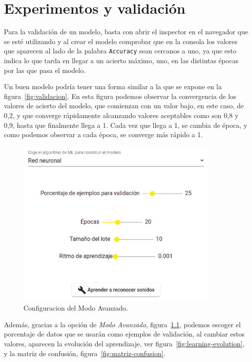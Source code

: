 \documentclass[a4paper, 12pt]{book}
\begin{document}

\cleardoublepage
\chapter{Experimentos y validación}
\label{chap:experimentos-validacion}

Para la validación de un modelo, basta con abrir el inspector en el navegador que se esté utilizando y al crear el modelo comprobar que en la consola los valores que aparecen al lado de la palabra \texttt{Accuracy} sean cercanos a uno, ya que esto indica lo que tarda en llegar a un acierto máximo, uno, en las distintas épocas por las que pasa el modelo.

Un buen modelo podría tener una forma similar a la que se expone en la figura~\ref{fig:validacion}. En esta figura podemos observar la convergencia de los valores de acierto del modelo, que comienzan con un valor bajo, en este caso, de 0,2, y que converge rápidamente alcanzando valores aceptables como son 0,8 y 0,9, hasta que finalmente llega a 1. Cada vez que llega a 1, se cambia de época, y como podemos observar a cada época, se converge más rápido a 1.

\begin{figure}
	\centering
	\includegraphics[width=10cm, keepaspectratio]{img/configuracion-25.png}
	\caption{Configuracion del Modo Avanzado.}\label{fig:configuracion}
\end{figure}

Además, gracias a la opción de \textit{Modo Avanzado}, figura~\ref{fig:configuracion}, podemos escoger el porcentaje de datos que se usarán como ejemplos de validación, al cambiar estos valores, aparecen la evolución del aprendizaje, ver figura~\ref{fig:learning-evolution}, y la matriz de confusión, figura~\ref{fig:matriz-confusion}.
\end{document}

